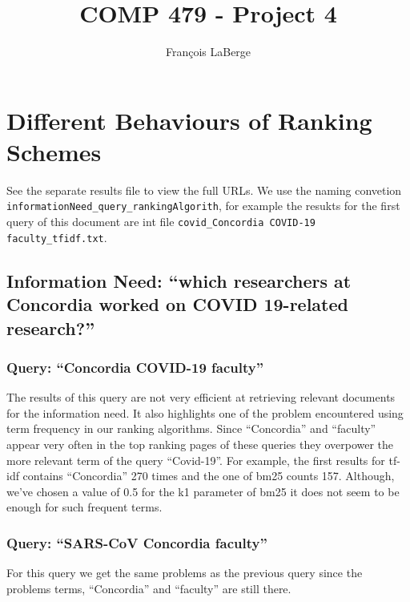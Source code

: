 \documentclass[]{article}
\title{COMP 479 - Project 4}
\author{François LaBerge}
\begin{document}
\maketitle


\section{Different Behaviours of Ranking Schemes}
See the separate results file to view the full URLs. We use the naming convetion \texttt{informationNeed_query_rankingAlgorith}, for example the resukts for the first query of this document are int file \texttt{covid_Concordia COVID-19 faculty_tfidf.txt}.

\subsection{Information Need: ``which researchers at Concordia worked on COVID 19-related research?''}
\subsubsection{Query: ``Concordia COVID-19 faculty''}
The results of this query are not very efficient at retrieving relevant documents for the information need. It also highlights one of the problem encountered using term frequency in our ranking algorithms. Since ``Concordia'' and ``faculty'' appear very often in the top ranking pages of these queries they overpower the more relevant term of the query ``Covid-19''. For example, the first results for tf-idf contains ``Concordia'' 270 times and the one of bm25 counts 157. Although, we've chosen a value of 0.5 for the k1 parameter of bm25 it does not seem to be enough for such frequent terms.

\subsubsection{Query: ``SARS-CoV Concordia faculty''}
For this query we get the same problems as the previous query since the problems terms, ``Concordia'' and ``faculty'' are still there.
\end{document}
